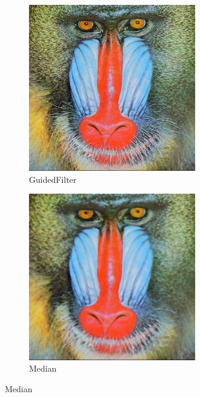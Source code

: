 \documentclass[12pt]{article}
\begin{document}
\begin{figure}
		\begin{subfigure}{0.4\textwidth}
			\centering
			\includegraphics[width=0.8\textwidth]{mandrill/mandrilltiffGuidedFilter.png}
			\caption{GuidedFilter}
		\end{subfigure}
		\begin{subfigure}{0.4\textwidth}
			\centering
			\includegraphics[width=0.8\textwidth]{mandrill/mandrilltiffMedianFilter.png}
			\caption{Median}
		\end{subfigure}
		

\end{figure}
\end{document}
